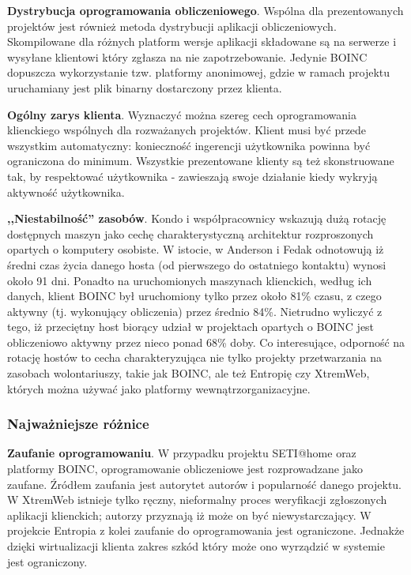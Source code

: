 \documentclass[12pt,a4paper,twoside]{article}
\begin{document}
\textbf{Dystrybucja oprogramowania obliczeniowego}. Wspólna dla prezentowanych projektów jest również metoda dystrybucji aplikacji obliczeniowych. Skompilowane dla różnych platform wersje aplikacji składowane są na serwerze i wysyłane klientowi który zgłasza na nie zapotrzebowanie. Jedynie BOINC dopuszcza wykorzystanie tzw. platformy anonimowej, gdzie w ramach projektu uruchamiany jest plik binarny dostarczony przez klienta.

\textbf{Ogólny zarys klienta}. Wyznaczyć można szereg cech oprogramowania klienckiego wspólnych dla rozważanych projektów. Klient musi być przede wszystkim automatyczny: konieczność ingerencji użytkownika powinna być ograniczona do minimum. Wszystkie prezentowane klienty są też skonstruowane tak, by respektować użytkownika - zawieszają swoje działanie kiedy wykryją aktywność użytkownika.

\textbf{,,Niestabilność'' zasobów}. Kondo i współpracownicy wskazują \cite{evaluating} dużą rotację dostępnych maszyn jako cechę charakterystyczną architektur rozproszonych opartych o komputery osobiste. W istocie, w \cite{computational} Anderson i Fedak odnotowują iż średni czas życia danego hosta (od pierwszego do ostatniego kontaktu) wynosi około 91 dni. Ponadto na uruchomionych maszynach klienckich, według ich danych, klient BOINC był uruchomiony tylko przez około 81\% czasu, z czego aktywny (tj. wykonujący obliczenia) przez średnio 84\%. Nietrudno wyliczyć z tego, iż przeciętny host biorący udział w projektach opartych o BOINC jest obliczeniowo aktywny przez nieco ponad 68\% doby. Co interesujące, odporność na rotację hostów to cecha charakteryzująca nie tylko projekty przetwarzania na zasobach wolontariuszy, takie jak BOINC, ale też Entropię czy XtremWeb, których można używać jako platformy wewnątrzorganizacyjne.

\subsubsection{Najważniejsze różnice}

\textbf{Zaufanie oprogramowaniu}. W przypadku projektu SETI@home oraz platformy BOINC, oprogramowanie obliczeniowe jest rozprowadzane jako zaufane. Źródłem zaufania jest autorytet autorów i popularność danego projektu. W XtremWeb istnieje tylko ręczny, nieformalny proces weryfikacji zgłoszonych aplikacji klienckich; autorzy przyznają \cite{xtremweb} iż może on być niewystarczający. W projekcie Entropia z kolei zaufanie do oprogramowania jest ograniczone. Jednakże dzięki wirtualizacji klienta zakres szkód który może ono wyrządzić w systemie jest ograniczony. 
\end{document}
